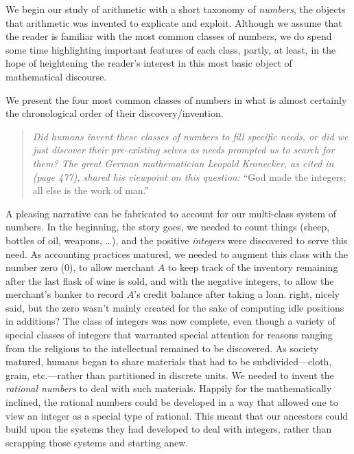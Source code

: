 We begin our study of arithmetic with a short taxonomy of {\it
  numbers}, the objects that arithmetic was invented to explicate and
exploit.  Although we assume that the reader is familiar with the most
common classes of numbers, we do spend some time highlighting
important features of each class, partly, at least, in the hope of
heightening the reader's interest in this most basic object of
mathematical discourse.

We present the four most common classes of numbers in what is almost
certainly the chronological order of their discovery/invention.
\begin{quote}
{\em Did humans {\em invent} these classes of numbers to fill specific
  needs, or did we just {\em discover} their pre-existing selves as
  needs prompted us to search for them?  The great German
  mathematician Leopold Kronecker,
as cited in \cite{Bell86} (page 477), shared his viewpoint on this
question:} ``God made the integers; all else is the work of man.''
\end{quote}
A pleasing narrative can be fabricated to account for our multi-class
system of numbers.  In the beginning, the story goes, we needed to
count things (sheep, bottles of oil, weapons, \ldots), and the
positive {\it integers} were discovered to serve
this need.  As accounting practices matured, we needed to augment this
class with the number zero  ($0$), to allow
merchant $A$ to keep track of the inventory remaining after the last
flask of wine is sold, and with the negative integers,
 to allow the merchant's banker to record $A$'s
credit balance after taking a loan.  
{\Denis right, nicely said, but the zero wasn't mainly created for the sake of computing idle positions
in additions?} The class of integers was now
complete, even though a variety of special classes of integers that
warranted special attention for reasons ranging from the religious to
the intellectual remained to be discovered.  As society matured,
humans began to share materials that had to be subdivided---cloth,
grain, etc.---rather than partitioned in discrete units.  We needed to
invent the {\it rational numbers} 
%
to deal with such materials.  Happily for the mathematically inclined,
the rational numbers could be developed in a way that allowed one to
view an integer as a special type of rational.  This meant that our
ancestors could build upon the systems they had developed to deal with
integers, rather than scrapping those systems and starting anew.
